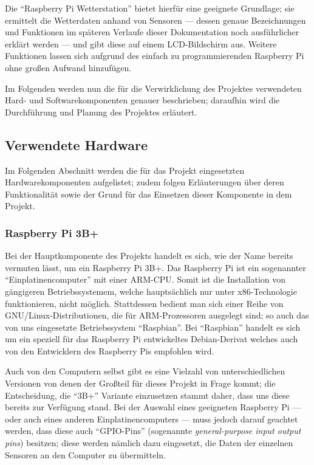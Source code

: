 \documentclass[a4paper,12pt]{article}
\begin{document}
Die "`Raspberry Pi Wetterstation"' bietet hierfür eine geeignete Grundlage; sie ermittelt die Wetterdaten anhand von Sensoren — dessen genaue Bezeichnungen und Funktionen im späteren Verlaufe dieser Dokumentation noch ausführlicher erklärt werden — und gibt diese auf einem LCD-Bildschirm aus. Weitere Funktionen lassen sich aufgrund des einfach zu programmierenden Raspberry Pi ohne großen Aufwand hinzufügen.

Im Folgenden werden nun die für die Verwirklichung des Projektes verwendeten Hard- und Softwarekomponenten genauer beschrieben; daraufhin wird die Durchführung und Planung des Projektes erläutert.
\pagebreak

\subsection{Verwendete Hardware}
Im Folgenden Abschnitt werden die für das Projekt eingesetzten Hardwarekomponenten aufgelistet; zudem folgen Erläuterungen über deren Funktionalität sowie der Grund für das Einsetzen dieser Komponente in dem Projekt.

\subsubsection{Raspberry Pi 3B+}
Bei der Hauptkomponente des Projekts handelt es sich, wie der Name bereits vermuten lässt, um ein Raspberry Pi 3B+.
Das Raspberry Pi ist ein sogenannter "`Einplatinencomputer"' mit einer ARM-CPU. Somit ist die Installation von gängigeren Betriebssystemem, welche hauptsächlich nur unter x86-Technologie funktionieren, nicht möglich. Stattdessen bedient man sich einer Reihe von GNU/Linux-Distributionen, die für ARM-Prozessoren ausgelegt sind; so auch das von uns eingesetzte Betriebssystem "`Raspbian"'. Bei "`Raspbian"' handelt es sich um ein speziell für das Raspberry Pi entwickeltes Debian-Derivat welches auch von den Entwicklern des Raspberry Pis empfohlen wird.

Auch von den Computern selbst gibt es eine Vielzahl von unterschiedlichen Versionen von denen der Großteil für dieses Projekt in Frage kommt; die Entscheidung, die "`3B+"' Variante einzusetzen stammt daher, dass uns diese bereits zur Verfügung stand. Bei der Auswahl eines geeigneten Raspberry Pi — oder auch eines anderen Einplatinencomputers — muss jedoch darauf geachtet werden, dass diese auch "`GPIO-Pins"' (sogenannte \textit{general-purpose input output pins}) besitzen; diese werden nämlich dazu eingesetzt, die Daten der einzelnen Sensoren an den Computer zu übermitteln.
\end{document}
